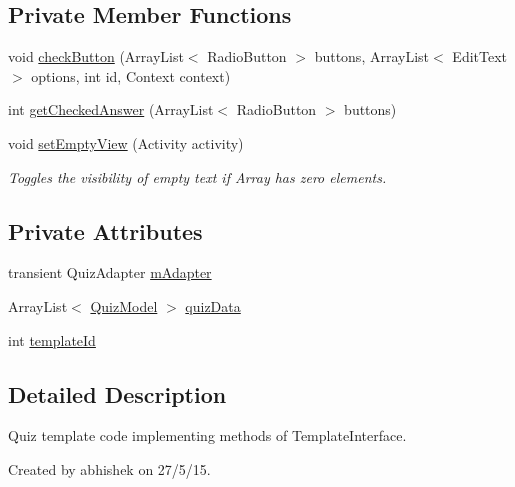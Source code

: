 \subsection*{Private Member Functions}
\begin{DoxyCompactItemize}
\item 
void \hyperlink{classorg_1_1buildmlearn_1_1toolkit_1_1templates_1_1QuizTemplate_af3655c5a5c8fa6b400f4174c14a75426}{check\+Button} (Array\+List$<$ Radio\+Button $>$ buttons, Array\+List$<$ Edit\+Text $>$ options, int id, Context context)
\item 
int \hyperlink{classorg_1_1buildmlearn_1_1toolkit_1_1templates_1_1QuizTemplate_a668e4276c19d4dd30f5250809196c256}{get\+Checked\+Answer} (Array\+List$<$ Radio\+Button $>$ buttons)
\item 
void \hyperlink{classorg_1_1buildmlearn_1_1toolkit_1_1templates_1_1QuizTemplate_a67a2a6db83844d5875375af21c58d3b7}{set\+Empty\+View} (Activity activity)
\begin{DoxyCompactList}\small\item\em Toggles the visibility of empty text if Array has zero elements. \end{DoxyCompactList}\end{DoxyCompactItemize}
\subsection*{Private Attributes}
\begin{DoxyCompactItemize}
\item 
transient Quiz\+Adapter \hyperlink{classorg_1_1buildmlearn_1_1toolkit_1_1templates_1_1QuizTemplate_ad6eb1e75e6feb5e1af118ef0781a6a13}{m\+Adapter}
\item 
Array\+List$<$ \hyperlink{classorg_1_1buildmlearn_1_1toolkit_1_1templates_1_1QuizModel}{Quiz\+Model} $>$ \hyperlink{classorg_1_1buildmlearn_1_1toolkit_1_1templates_1_1QuizTemplate_adb05fdc78ce8f4f5198dec8c1e3c5504}{quiz\+Data}
\item 
int \hyperlink{classorg_1_1buildmlearn_1_1toolkit_1_1templates_1_1QuizTemplate_a3aa259fc687f8ba50518707c422a9611}{template\+Id}
\end{DoxyCompactItemize}


\subsection{Detailed Description}
Quiz template code implementing methods of Template\+Interface. 

Created by abhishek on 27/5/15. 

